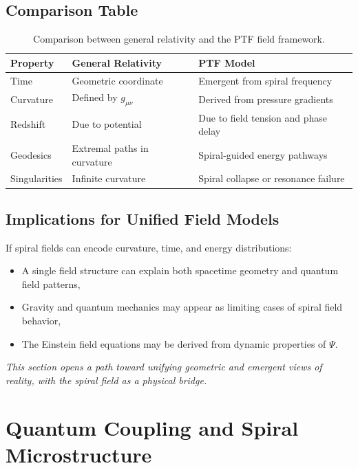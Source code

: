 \documentclass[a4paper,12pt]{article}
\begin{document}
\subsection{Comparison Table}

\begin{table}[H]
\centering
\begin{tabular}{|l|p{5.5cm}|p{5.5cm}|}
\hline
\textbf{Property} & \textbf{General Relativity} & \textbf{PTF Model} \\
\hline
Time & Geometric coordinate & Emergent from spiral frequency \\
Curvature & Defined by \(g_{\mu\nu}\) & Derived from pressure gradients \\
Redshift & Due to potential & Due to field tension and phase delay \\
Geodesics & Extremal paths in curvature & Spiral-guided energy pathways \\
Singularities & Infinite curvature & Spiral collapse or resonance failure \\
\hline
\end{tabular}
\caption{Comparison between general relativity and the PTF field framework.}
\end{table}

\subsection{Implications for Unified Field Models}

If spiral fields can encode curvature, time, and energy distributions:
\begin{itemize}
    \item A single field structure can explain both spacetime geometry and quantum field patterns,
    \item Gravity and quantum mechanics may appear as limiting cases of spiral field behavior,
    \item The Einstein field equations may be derived from dynamic properties of \(\Psi\).
\end{itemize}

\textit{This section opens a path toward unifying geometric and emergent views of reality, with the spiral field as a physical bridge.}

\section{Quantum Coupling and Spiral Microstructure}
\label{sec:quantum}
\end{document}
